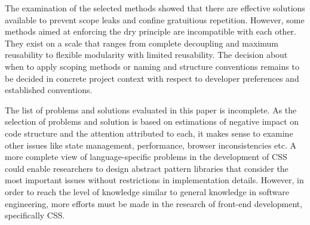 The examination of the selected methods showed that there are effective solutions available to prevent scope leaks and confine gratuitious repetition.
However, some methods aimed at enforcing the \gls{dry} principle are incompatible with each other.
They exist on a scale that ranges from complete decoupling and maximum reusability to flexible modularity with limited reusability.
The decision about when to apply scoping methods or naming and structure conventions remains to be decided in concrete project context with respect to developer preferences and established conventions.

The list of problems and solutions evaluated in this paper is incomplete.
As the selection of problems and solution is based on estimations of negative impact on code structure and the attention attributed to each, it makes sense to examine other issues like state management, performance, browser inconsistencies etc.
A more complete view of language-specific problems in the development of CSS could enable researchers to design abstract pattern libraries that consider the most important issues without restrictions in implementation details.
However, in order to reach the level of knowledge similar to general knowledge in software engineering, more efforts must be made in the research of front-end development, specifically CSS.
